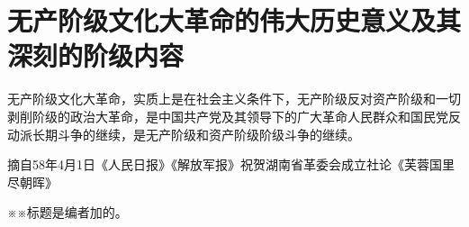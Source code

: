 \section[无产阶级文化大革命的伟大历史意义及其深刻的阶级内容]{无产阶级文化大革命的伟大历史意义及其深刻的阶级内容}


无产阶级文化大革命，实质上是在社会主义条件下，无产阶级反对资产阶级和一切剥削阶级的政治大革命，是中国共产党及其领导下的广大革命人民群众和国民党反动派长期斗争的继续，是无产阶级和资产阶级阶级斗争的继续。

摘自58年4月1日《人民日报》《解放军报》祝贺湖南省革委会成立社论《芙蓉国里尽朝晖》

※※标题是编者加的。

